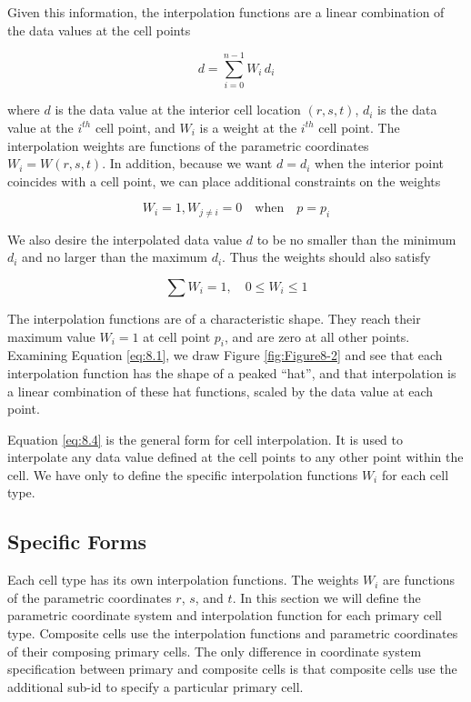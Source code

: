 Given this information, the interpolation functions are a linear combination of the data values at the cell points

\begin{equation}\label{eq:8.4}
d = \sum_{i = 0}^{n - 1}W_i\,  d_i
\end{equation}

where $d$ is the data value at the interior cell location $(r,s,t)$, $d_i$ is the data value at the $i^{th}$ cell point, and $W_i$ is a weight at the $i^{th}$ cell point. The interpolation weights are functions of the parametric coordinates $W_i = W(r,s,t)$. In addition, because we want $d = d_i$ when the interior point coincides with a cell point, we can place additional constraints on the weights

\begin{equation}\label{eq:8.5}
W_i = 1, W_{j \neq i} = 0 \quad \text{when} \quad p = p_i
\end{equation}

We also desire the interpolated data value $d$ to be no smaller than the minimum $d_i$ and no larger than the maximum $d_i$. Thus the weights should also satisfy

\begin{equation}\label{eq:8.6}
\sum W_i = 1, \quad 0 \leq W_i \leq 1
\end{equation}

The interpolation functions are of a characteristic shape. They reach their maximum value $W_i = 1$ at cell point $p_i$, and are zero at all other points. Examining Equation \ref{eq:8.1}, we draw Figure \ref{fig:Figure8-2} and see that each interpolation function has the shape of a peaked ``hat'', and that interpolation is a linear combination of these hat functions, scaled by the data value at each point.

Equation \ref{eq:8.4} is the general form for cell interpolation. It is used to interpolate any data value defined at the cell points to any other point within the cell. We have only to define the specific interpolation functions $W_i$ for each cell type.

\subsection{Specific Forms}

Each cell type has its own interpolation functions. The weights $W_i$ are functions of the parametric coordinates $r$, $s$, and $t$. In this section we will define the parametric coordinate system and interpolation function for each primary cell type. Composite cells use the interpolation functions and parametric coordinates of their composing primary cells. The only difference in coordinate system specification between primary and composite cells is that composite cells use the additional sub-id to specify a particular primary cell.

